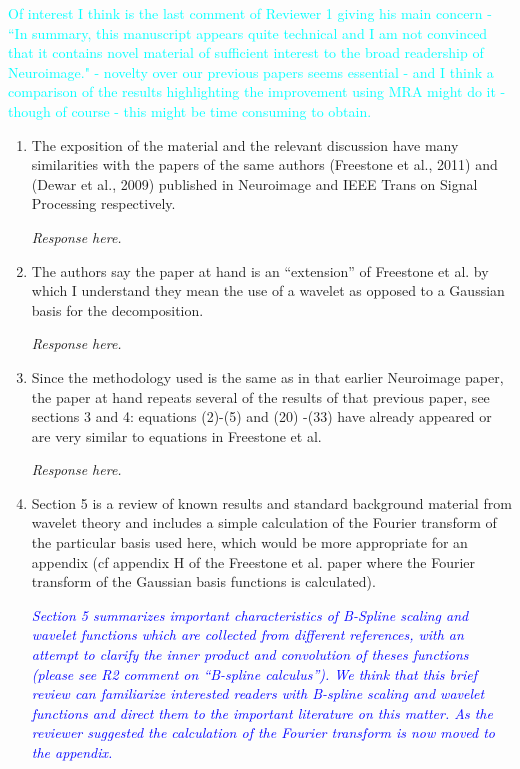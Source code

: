 \documentclass{article}
\newcommand{\parham}[1]{\textcolor{blue}{#1}}
\newcommand{\ken}[1]{\textcolor{cyan}{#1}}
\begin{document}

\ken{Of interest I think is the last comment of Reviewer 1 giving his main concern - ``In summary, this manuscript appears quite technical and I am not convinced that it contains novel material of sufficient interest to the broad readership of Neuroimage." -  novelty over our previous papers seems essential - and I think a comparison of the results highlighting the improvement using MRA might do it - though of course - this might be time consuming to obtain.}

    \begin{enumerate}
        \item The exposition of the material and the relevant discussion have many similarities with the papers of the same authors (Freestone et al., 2011) and (Dewar et al., 2009) published in Neuroimage and IEEE Trans on Signal Processing  respectively.

	\emph{Response here.}
	
        \item The authors say the paper at hand is an ``extension'' of Freestone et al. by which I understand they mean the use of a wavelet as opposed to a Gaussian basis for the decomposition.

	\emph{Response here.}

        \item Since the methodology used is the same as in that earlier Neuroimage paper, the paper at hand repeats several of  the results of that previous paper, see sections 3 and 4: equations (2)-(5) and (20) -(33) have already appeared or are very similar to equations in Freestone et al.

	\emph{Response here.}
	        
        \item Section 5 is a review of known results and standard background material from wavelet theory and includes a simple calculation of the Fourier transform of the particular basis used here, which would be more appropriate for an appendix (cf appendix H of the Freestone et al. paper where the Fourier transform of the Gaussian basis functions is calculated).

		\emph{\parham{Section 5 summarizes important characteristics of B-Spline scaling and wavelet functions which are collected from different references, with an attempt to clarify the inner product and convolution of theses functions (please see R2 comment on ``B-spline calculus''). We think that this brief review can familiarize interested readers  with  B-spline scaling and wavelet functions and direct them to the important literature on this matter. As the reviewer suggested the calculation of the Fourier transform is now moved to the appendix.}}


\end{enumerate}
\end{document}
